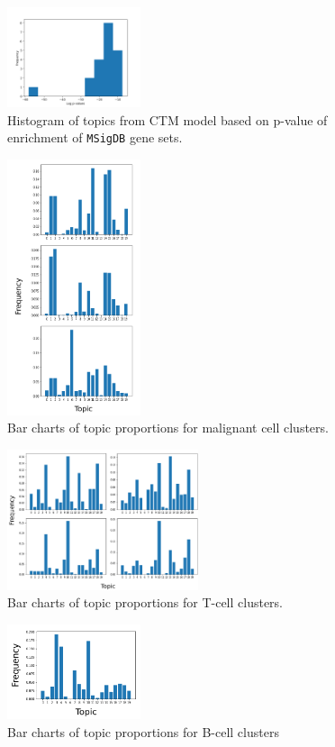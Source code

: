 \documentclass{article}
\begin{document}
\begin{figure}
    \centering
    \includegraphics[width=0.35\textwidth]{figs/ctm_pvals}
    \caption{Histogram of topics from CTM model based on p-value of enrichment of \texttt{MSigDB} gene sets.}
    \label{fig:ctm_pvals}
\end{figure}

\begin{figure}
    \centering
    \includegraphics[width=0.35\textwidth]{figs/tumortopics}
    \caption{Bar charts of topic proportions for malignant cell clusters.}
    \label{fig:tumortopics}
\end{figure}
\begin{figure}
    \centering
    \includegraphics[width=0.5\textwidth]{figs/tcelltopics}
    \caption{Bar charts of topic proportions for T-cell clusters.}
    \label{fig:tcelltopics}
\end{figure}
\begin{figure}
    \centering
    \includegraphics[width=0.35\textwidth]{figs/bcelltopics}
    \caption{Bar charts of topic proportions for B-cell clusters}
    \label{fig:bcelltopics}
\end{figure}
\end{document}
